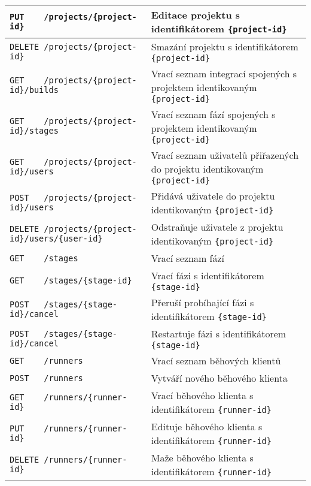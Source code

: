 \begin{sidewaystable}[ht]
\begin{tabular}{|l|l|}
\verb|PUT    /projects/{project-id}|                     & Editace projektu s identifikátorem \verb|{project-id}| \\ \hline
\verb|DELETE /projects/{project-id}|                     & Smazání projektu s identifikátorem \verb|{project-id}| \\ \hline
\verb|GET    /projects/{project-id}/builds|              & Vrací seznam integrací spojených s projektem identikovaným \verb|{project-id}| \\ \hline
\verb|GET    /projects/{project-id}/stages|              & Vrací seznam fází spojených s projektem identikovaným \verb|{project-id}| \\ \hline
\verb|GET    /projects/{project-id}/users|               & Vrací seznam uživatelů přiřazených do projektu identikovaným \verb|{project-id}| \\ \hline
\verb|POST   /projects/{project-id}/users|               & Přidává uživatele do projektu identikovaným \verb|{project-id}| \\ \hline
\verb|DELETE /projects/{project-id}/users/{user-id}|     & Odstraňuje uživatele z projektu identikovaným \verb|{project-id}| \\ \hline
\verb|GET    /stages|                                    & Vrací seznam fází \\ \hline
\verb|GET    /stages/{stage-id}|                         & Vrací fázi s identifikátorem \verb|{stage-id}| \\ \hline
\verb|POST   /stages/{stage-id}/cancel|                  & Přeruší probíhající fázi s identifikátorem \verb|{stage-id}| \\ \hline
\verb|POST   /stages/{stage-id}/cancel|                  & Restartuje fázi s identifikátorem \verb|{stage-id}| \\ \hline
\verb|GET    /runners|                                   & Vrací seznam běhových klientů \\ \hline
\verb|POST   /runners|                                   & Vytváří nového běhového klienta \\ \hline
\verb|GET    /runners/{runner-id}|                       & Vrací běhového klienta s identifikátorem \verb|{runner-id}| \\ \hline
\verb|PUT    /runners/{runner-id}|                       & Edituje běhového klienta s identifikátorem \verb|{runner-id}| \\ \hline
\verb|DELETE /runners/{runner-id}|                       & Maže běhového klienta s identifikátorem \verb|{runner-id}| \\ \hline

\end{tabular}
\end{sidewaystable}
